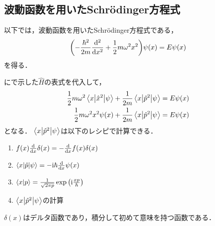 \documentclass{report}
\begin{document}
  \subsection{波動函数を用いたSchr\"odinger方程式}
    以下では，波動函数を用いたSchr\"odinger方程式である，
    \begin{align}
      \qty(-\frac{\hbar^2}{2m}\dv[2]{x} + \frac{1}{2}m\omega^2x^2)\psi(x) = E\psi(x)
    \end{align}
    を得る．
    \par
    にで示した$\hat{H}$の表式を代入して，
    \begin{align}
      \frac{1}{2}m\omega^2\mel**{x}{\hat{x}^2}{\psi} + \frac{1}{2m}\mel**{x}{\hat{p}^2}{\psi} &= E\psi(x) \\ 
      \frac{1}{2}m\omega^2x^2\psi(x) + \frac{1}{2m}\mel**{x}{\hat{p}^2}{\psi} &= E\psi(x) \label{input-to-schrodinger}
    \end{align}
    となる．
    $\mel**{x}{\hat{p}^2}{\psi}$は以下のレシピで計算できる．
    \begin{enumerate}
      \item $f(x)\dv{x}\delta(x) = -\dv{x}f(x)\delta(x)$
      \item $\mel**{x}{\hat{p}}{\psi} = -\mathrm{i}\hbar\dv{x}\psi(x)$
      \item $\braket{x}{p} = \frac{1}{\sqrt{2\pi p}}\exp\qty(\mathrm{i}\frac{xp}{\hbar})$
      \item $\mel**{x}{\hat{p}^2}{\psi}$の計算
    \end{enumerate}
    $\delta(x)$はデルタ函数であり，積分して初めて意味を持つ函数である．
\end{document}
